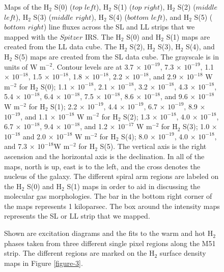 \documentclass[manuscript]{aastex}
\begin{document}
 \begin{figure}
 \caption{Maps of the $\mathrm{H_2}$ S(0) ($top$ $left$), $\mathrm{H_2}$ S(1)
 ($top$ $right$), $\mathrm{H_2}$ S(2) ($middle$ $left$), $\mathrm{H_2}$ S(3) 
 ($middle$ $right$), $\mathrm{H_2}$ S(4) ($bottom$ $left$), and $\mathrm{H_2}$ 
 S(5) ($bottom$ $right$) line fluxes across the SL and LL strips that we mapped 
 with the $Spitzer$ IRS.  The $\mathrm{H_2}$ S(0) and $\mathrm{H_2}$ S(1) 
 maps are created from the LL data cube.    
The $\mathrm{H_2}$ S(2), $\mathrm{H_2}$ S(3), $\mathrm{H_2}$ S(4), and 
$\mathrm{H_2}$ S(5) maps are created from the SL data cube.  
The grayscale is in units of W $\mathrm{m^{-2}}$.  Contour levels are at 
3.7 $\times$ ${10^{-19}}$, 7.3 $\times$ ${10^{-19}}$, 1.1 $\times$ ${10^{-18}}$, 1.5 $\times$ ${10^{-18}}$, 1.8 $\times$ ${10^{-18}}$, 2.2 $\times$ ${10^{-18}}$, and 2.9 $\times$ ${10^{-18}}$ W $\mathrm{m^{-2}}$ for $\mathrm{H_2}$ S(0); 
1.1 $\times$ ${10^{-18}}$, 2.1 $\times$ ${10^{-18}}$, 3.2 $\times$ ${10^{-18}}$, 4.3 $\times$ ${10^{-18}}$, 5.4 $\times$ ${10^{-18}}$, 6.4 $\times$ ${10^{-18}}$, 7.5 $\times$ ${10^{-18}}$, 8.6 $\times$ ${10^{-18}}$, and 9.6 $\times$ ${10^{-18}}$ W $\mathrm{m^{-2}}$ for $\mathrm{H_2}$ S(1); 
2.2 $\times$ ${10^{-19}}$, 4.4 $\times$ ${10^{-19}}$,  6.7 $\times$ ${10^{-19}}$, 8.9 $\times$ ${10^{-19}}$, and 1.1 $\times$ ${10^{-18}}$ W $\mathrm{m^{-2}}$ for $\mathrm{H_2}$ S(2);
1.3 $\times$ ${10^{-18}}$, 4.0 $\times$ ${10^{-18}}$, 6.7 $\times$ ${10^{-18}}$, 9.4 $\times$ ${10^{-18}}$, and 1.2 $\times$ ${10^{-17}}$ W $\mathrm{m^{-2}}$ for $\mathrm{H_2}$ S(3);  
1.0 $\times$ ${10^{-18}}$ and 2.0 $\times$ ${10^{-18}}$ W $\mathrm{m^{-2}}$ for $\mathrm{H_2}$ S(4); 
8.0 $\times$ ${10^{-19}}$, 4.0 $\times$ ${10^{-18}}$, and 7.3 $\times$ ${10^{-18}}$W $\mathrm{m^{-2}}$ for $\mathrm{H_2}$ S(5).  
The vertical axis is the right ascension and the horizontal axis is the declination.  
In all of the maps, north is up, east is to the left, and the cross 
denotes the nucleus of the galaxy.  The different spiral 
arm regions are labeled on the $\mathrm{H_2}$ S(0) and $\mathrm{H_2}$ S(1) 
maps in order to aid in discussing the molecular gas morphologies.  
The bar in the bottom right corner of the maps 
represents 1 kiloparsec.  The box around 
the intensity maps represents the SL or LL strip that we mapped.}
  \label{figure-1}
  \end{figure}

\clearpage

\begin{figure}
\caption{Shown are excitation diagrams and the fits to the warm
and hot H$_2$ phases taken from three different single pixel regions along the M51 strip. 
The different regions are marked on the H$_2$ surface density maps 
in Figure \ref{figure-3}.}
\label{figure-2}
\end{figure}
\end{document}
